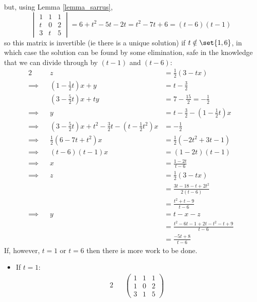 \documentclass[fleqn,a4paper,11pt]{article}
\begin{document}
\begin{enumerate}[label=\textbf{\arabic*.}]
   but, using Lemma \ref{lemma_sarrus},
   \begin{equation*}
    \begin{vmatrix}
     1 & 1 & 1 \\
     t & 0 & 2 \\
     3 & t & 5
    \end{vmatrix}
    = 6 + t^2 - 5t - 2t
    = t^2 - 7t + 6
    = (t - 6)(t - 1)
   \end{equation*}
   so this matrix is invertible (ie there is a unique solution) if
   \(t \notin \set{1, 6}\), in which case the solution can be found by some
   elimination, safe in the knowledge that we can divide through by \((t - 1)\)
   and \((t - 6)\):
   \begin{alignat*}2
    && z &= \tfrac 12(3 - tx) \\
    \implies{}&& (1 - \tfrac 12 t)x + y &= t - \tfrac 32 \\
    && (3 - \tfrac 52 t) x + ty &= 7 - \tfrac{15}2 = -\tfrac 12 \\
    \implies{}&& y &= t - \tfrac 32 - (1 - \tfrac 12 t)x \\
    \implies{}&& (3 - \tfrac 52 t) x + t^2 - \tfrac 32 t - (t - \tfrac 12 t^2) x
     &= -\tfrac 12 \\
    \implies{}&& \tfrac 12(6 - 7t + t^2) x &= \tfrac 12(-2t^2 + 3t - 1) \\
    \implies{}&& (t - 6)(t - 1) x &= (1 - 2t)(t - 1) \\
    \implies{}&& x &= \frac{1 - 2t}{t - 6} \\
    \implies{}&& z &= \tfrac 12(3 - tx) \\
    && &= \frac{3t - 18 - t + 2t^2}{2(t - 6)} \\
    && &= \frac{t^2 + t - 9}{t - 6} \\
    \implies{}&& y &= t - x - z \\
    && &= \frac{t^2 - 6t - 1 + 2t - t^2 - t + 9}{t - 6} \\
    && &= \frac{-5t + 8}{t - 6}
   \end{alignat*}
   If, however, \(t = 1\) or \(t = 6\) then there is more work to be done.
   \begin{itemize}
    \item If \(t = 1\):
     \begin{alignat*}2
      &&\begin{pmatrix}
       1 & 1 & 1 \\
       1 & 0 & 2 \\
       3 & 1 & 5

\end{pmatrix}
\end{alignat*}
\end{itemize}
\end{enumerate}
\end{document}
